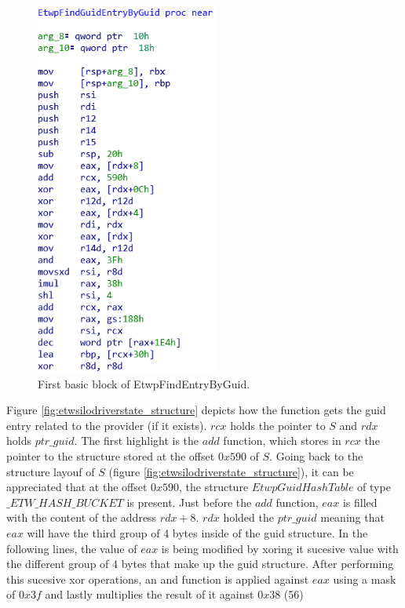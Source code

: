 \begin{centering}
\begin{figure}[H]
  \includegraphics[width=6cm]{images/etwpfindentrybyguid1.png}
  \caption[]{First basic block of EtwpFindEntryByGuid.}
  \label{fig:EtwpFindEntryByGuid}
\end{figure}
\end{centering}

Figure \ref{fig:etwsilodriverstate_structure} depicts how the function gets the guid entry related to the provider (if it exists). $rcx$ holds the pointer to $S$ and $rdx$ holds $ptr\_guid$.
The first highlight is the $add$ function, which stores in $rcx$ the pointer to the structure stored at the offset $0x590$ of $S$. Going back to the structure layouf of $S$ (figure \ref{fig:etwsilodriverstate_structure}), it can be appreciated that at the offset $0x590$, the structure $EtwpGuidHashTable$ of type $\_ETW\_HASH\_BUCKET$ is present.  
Just before the $add$ function, $eax$ is filled with the content of the address $rdx+8$. $rdx$ holded the $ptr\_guid$ meaning that $eax$ will have the third group of 4 bytes inside of the guid structure. In the following lines, the value of $eax$ is being modified by xoring it sucesive value with the different group of 4 bytes that make up the guid structure. After performing this sucesive xor operations, an and function is applied against $eax$ using a mask of $0x3f$ and lastly multiplies the result of it against $0x38$ (56)

















